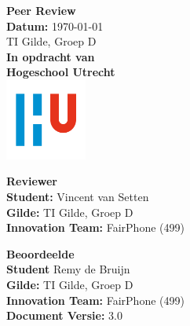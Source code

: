 \documentclass[a4paper]{article}
\begin{document}
\begin{titlepage}
  \begin{center}
      \vspace*{.9cm}
      \Huge
      \textbf{ Peer Review }\\
      \vspace{0.2cm}
      \small \textbf{Datum:} \today \\
      \small TI Gilde, Groep D \\

      \vspace{2cm}
      \normalsize
      \vspace{1cm}
      \Large
      \textbf{In opdracht van}\\
      \large
      \textbf{Hogeschool Utrecht} \\
      \includegraphics[width=0.2\textwidth]{Images/logouni.png}
      \vfill

      \begin{minipage}{0.45\textwidth}
        \large
        \textbf{Reviewer}\\
        \normalsize
        \textbf{Student:} Vincent van Setten \\
        \textbf{Gilde:} TI Gilde, Groep D\\
        \textbf{Innovation Team:} FairPhone (499) \\
        \vspace{2cm}
      \end{minipage}
      \hfill
      \begin{minipage}{0.45\textwidth}
        \large
        \textbf{Beoordeelde}\\
        \normalsize
        \textbf{Student} Remy de Bruijn  \\
        \textbf{Gilde:} TI Gilde, Groep D\\
        \textbf{Innovation Team:} FairPhone (499) \\
        \textbf{Document Versie:} 3.0 \\
        \vspace{2cm}
      \end{minipage}
    \end{center}
\end{titlepage}
\end{document}
